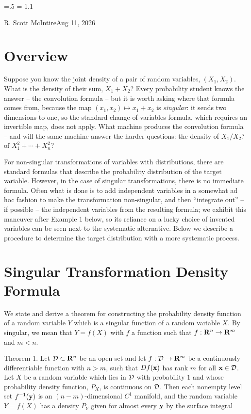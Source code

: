 

\parindent=0pt
\parskip=.5\baselineskip
\baselineskip = 1.1\baselineskip

\footline{\hss\tenrm\folio\hss}

{R. Scott McIntire}{Aug 11, 2026}

\section{Overview}
Suppose you know the joint density of a pair of random variables,
$(X_1, X_2)$. What is the density of their sum, $X_1 + X_2$? Every
probability student knows the answer -- the convolution formula -- but it
is worth asking where that formula comes from, because the map
$(x_1, x_2) \mapsto x_1 + x_2$ is {\it singular\/}: it sends two dimensions
to one, so the standard change-of-variables formula, which requires an
invertible map, does not apply. What machine produces the convolution
formula -- and will the same machine answer the harder questions: the
density of $X_1/X_2$? of $X_1^2 + \cdots + X_n^2$?

For non-singular transformations of variables with distributions, there
are standard formulas that describe the probability distribution
of the target variable. However, in the case of singular transformations,
there is no immediate formula. Often what is done is to add independent
variables in a somewhat ad hoc fashion to make the transformation
non-singular, and then ``integrate out'' -- if possible --
the independent variables from the resulting formula; we exhibit this
maneuver after Example 1 below, so its reliance on a lucky choice of
invented variables can be seen next to the systematic alternative.
Below we describe a procedure to determine the
target distribution with a more systematic process.

\section{Singular Transformation Density Formula}
We state and derive a theorem for constructing the probability
density function of a random variable $Y$ which is a singular function of a
random variable $X$. By singular, we mean that $Y = f(X)$ with $f$ a function
such that $f: {\bf R}^n \to {\bf R}^m$ and $m < n$.

\proclaim Theorem 1. Let ${\cal D} \subset {\bf R}^n$ be an open set and let
          $f : {\cal D} \to {\bf R}^m$ be a continuously
          differentiable function with $n > m$, such that $Df({\bf x})$ has
          rank $m$ for all ${\bf x} \in {\cal D}$. Let $X$ be a random variable
          which lies in ${\cal D}$ with probability $1$ and whose probability
          density function, $P_X$, is continuous on ${\cal D}$. Then each nonempty level set
          $f^{-1}({\bf y})$ is an $(n-m)$-dimensional $C^1$ manifold, and the
          random variable $Y = f(X)$ has a density $P_Y$ given for almost
          every ${\bf y}$ by the surface integral

